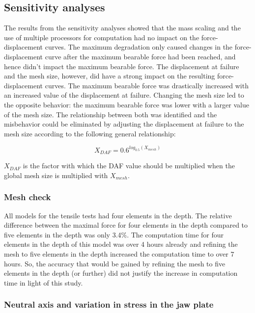 \subsection{Sensitivity analyses}

The results from the sensitivity analyses showed that the mass scaling and the use of multiple processors for computation had no impact on the force-displacement curves. The maximum degradation only caused changes in the force-displacement curve after the maximum bearable force had been reached, and hence didn't impact the maximum bearable force. The displacement at failure and the mesh size, however, did have a strong impact on the resulting force-displacement curves. The maximum bearable force was drastically increased with an increased value of the displacement at failure. Changing the mesh size led to the opposite behavior: the maximum bearable force was lower with a larger value of the mesh size. The relationship between both was identified and the misbehavior could be eliminated by adjusting the displacement at failure to the mesh size according to the following general relationship:

\begin{equation}
X_{DAF}=0.6^{log_{0.5}(X_{mesh})} 
\end{equation}

\noindent $X_{DAF}$ is the factor with which the DAF value should be multiplied when the global mesh size is multiplied with $X_{mesh}$.

\subsubsection{Mesh check}

All models for the tensile tests had four elements in the depth. The relative difference between the maximal force for four elements in the depth compared to five elements in the depth was only 3.4\%. The computation time for four elements in the depth of this model was over 4 hours already and refining the mesh to five elements in the depth increased the computation time to over 7 hours. So, the accuracy that would be gained by refining the mesh to five elements in the depth (or further) did not justify the increase in computation time in light of this study.

\subsubsection{Neutral axis and variation in stress in the jaw plate}

